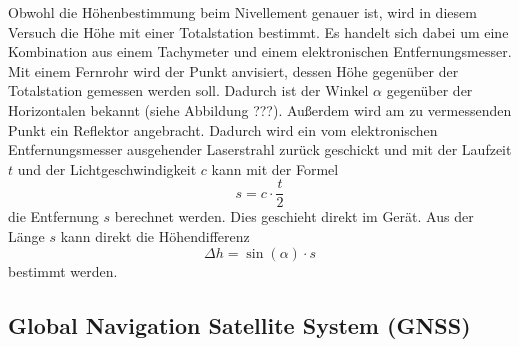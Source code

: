 Obwohl die Höhenbestimmung beim Nivellement genauer ist, wird in diesem Versuch die Höhe mit einer Totalstation bestimmt. Es handelt sich dabei um eine Kombination aus einem Tachymeter und einem elektronischen Entfernungsmesser. Mit einem Fernrohr wird der Punkt anvisiert, dessen Höhe gegenüber der Totalstation gemessen werden soll. Dadurch ist der Winkel $\alpha$ gegenüber der Horizontalen bekannt (siehe Abbildung ???). Außerdem wird am zu vermessenden Punkt ein Reflektor angebracht. Dadurch wird ein vom elektronischen Entfernungsmesser ausgehender Laserstrahl zurück geschickt und mit der Laufzeit $t$ und der Lichtgeschwindigkeit $c$ kann mit der Formel
\begin{equation}
 s=c\cdot \frac{t}{2}
\end{equation}
die Entfernung $s$ berechnet werden. Dies geschieht direkt im Gerät. Aus der Länge $s$ kann direkt die Höhendifferenz
\begin{equation}
 \Delta h=\sin(\alpha)\cdot s
\end{equation}
bestimmt werden. 

\subsection{Global Navigation Satellite System (GNSS)}


